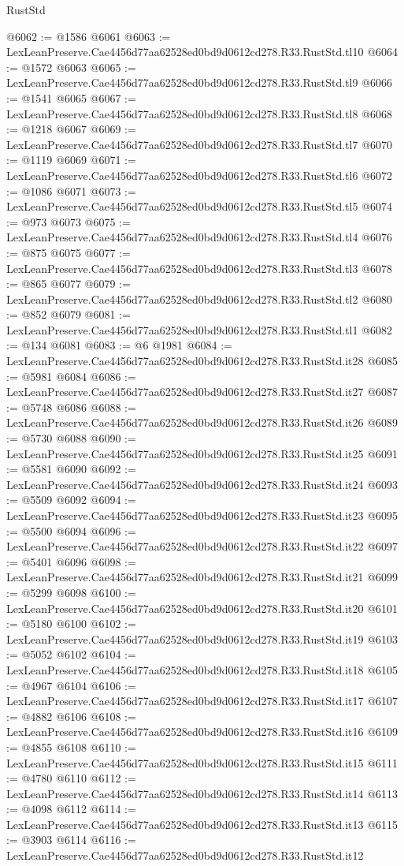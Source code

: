 \begin{lexlean}{RustStd}
\begin{coremodule}
@6062 := @1586 @6061
@6063 := LexLeanPreserve.Cae4456d77aa62528ed0bd9d0612cd278.R33.RustStd.tl10
@6064 := @1572 @6063
@6065 := LexLeanPreserve.Cae4456d77aa62528ed0bd9d0612cd278.R33.RustStd.tl9
@6066 := @1541 @6065
@6067 := LexLeanPreserve.Cae4456d77aa62528ed0bd9d0612cd278.R33.RustStd.tl8
@6068 := @1218 @6067
@6069 := LexLeanPreserve.Cae4456d77aa62528ed0bd9d0612cd278.R33.RustStd.tl7
@6070 := @1119 @6069
@6071 := LexLeanPreserve.Cae4456d77aa62528ed0bd9d0612cd278.R33.RustStd.tl6
@6072 := @1086 @6071
@6073 := LexLeanPreserve.Cae4456d77aa62528ed0bd9d0612cd278.R33.RustStd.tl5
@6074 := @973 @6073
@6075 := LexLeanPreserve.Cae4456d77aa62528ed0bd9d0612cd278.R33.RustStd.tl4
@6076 := @875 @6075
@6077 := LexLeanPreserve.Cae4456d77aa62528ed0bd9d0612cd278.R33.RustStd.tl3
@6078 := @865 @6077
@6079 := LexLeanPreserve.Cae4456d77aa62528ed0bd9d0612cd278.R33.RustStd.tl2
@6080 := @852 @6079
@6081 := LexLeanPreserve.Cae4456d77aa62528ed0bd9d0612cd278.R33.RustStd.tl1
@6082 := @134 @6081
@6083 := @6 @1981
@6084 := LexLeanPreserve.Cae4456d77aa62528ed0bd9d0612cd278.R33.RustStd.it28
@6085 := @5981 @6084
@6086 := LexLeanPreserve.Cae4456d77aa62528ed0bd9d0612cd278.R33.RustStd.it27
@6087 := @5748 @6086
@6088 := LexLeanPreserve.Cae4456d77aa62528ed0bd9d0612cd278.R33.RustStd.it26
@6089 := @5730 @6088
@6090 := LexLeanPreserve.Cae4456d77aa62528ed0bd9d0612cd278.R33.RustStd.it25
@6091 := @5581 @6090
@6092 := LexLeanPreserve.Cae4456d77aa62528ed0bd9d0612cd278.R33.RustStd.it24
@6093 := @5509 @6092
@6094 := LexLeanPreserve.Cae4456d77aa62528ed0bd9d0612cd278.R33.RustStd.it23
@6095 := @5500 @6094
@6096 := LexLeanPreserve.Cae4456d77aa62528ed0bd9d0612cd278.R33.RustStd.it22
@6097 := @5401 @6096
@6098 := LexLeanPreserve.Cae4456d77aa62528ed0bd9d0612cd278.R33.RustStd.it21
@6099 := @5299 @6098
@6100 := LexLeanPreserve.Cae4456d77aa62528ed0bd9d0612cd278.R33.RustStd.it20
@6101 := @5180 @6100
@6102 := LexLeanPreserve.Cae4456d77aa62528ed0bd9d0612cd278.R33.RustStd.it19
@6103 := @5052 @6102
@6104 := LexLeanPreserve.Cae4456d77aa62528ed0bd9d0612cd278.R33.RustStd.it18
@6105 := @4967 @6104
@6106 := LexLeanPreserve.Cae4456d77aa62528ed0bd9d0612cd278.R33.RustStd.it17
@6107 := @4882 @6106
@6108 := LexLeanPreserve.Cae4456d77aa62528ed0bd9d0612cd278.R33.RustStd.it16
@6109 := @4855 @6108
@6110 := LexLeanPreserve.Cae4456d77aa62528ed0bd9d0612cd278.R33.RustStd.it15
@6111 := @4780 @6110
@6112 := LexLeanPreserve.Cae4456d77aa62528ed0bd9d0612cd278.R33.RustStd.it14
@6113 := @4098 @6112
@6114 := LexLeanPreserve.Cae4456d77aa62528ed0bd9d0612cd278.R33.RustStd.it13
@6115 := @3903 @6114
@6116 := LexLeanPreserve.Cae4456d77aa62528ed0bd9d0612cd278.R33.RustStd.it12

\end{coremodule}
\end{lexlean}
